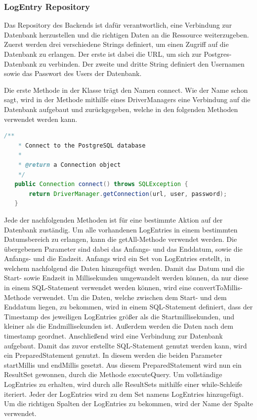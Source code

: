 \subsubsection{LogEntry Repository}
Das Repository des Backends ist dafür verantwortlich, eine Verbindung zur Datenbank herzustellen und die richtigen Daten an die Ressource weiterzugeben. Zuerst werden drei verschiedene Strings definiert, um einen Zugriff auf die Datenbank zu erlangen. Der erste ist dabei die URL, um sich zur Postgres-Datenbank zu verbinden. Der zweite und dritte String definiert den Usernamen sowie das Passwort des Users der Datenbank.
 
Die erste Methode in der Klasse trägt den Namen connect. Wie der Name schon sagt, wird in der Methode mithilfe eines DriverManagers eine Verbindung auf die Datenbank aufgebaut und zurückgegeben, welche in den folgenden Methoden verwendet werden kann.
 
\begin{lstlisting}[language=java,caption=Connect to SQL Database,label=lst:impl:connect]
    /**
    * Connect to the PostgreSQL database
    *
    * @return a Connection object
    */
   public Connection connect() throws SQLException {
       return DriverManager.getConnection(url, user, password);
   }  
\end{lstlisting}
 
Jede der nachfolgenden Methoden ist für eine bestimmte Aktion auf der Datenbank zuständig.
Um alle vorhandenen LogEntries in einem bestimmten Datumsbereich zu erlangen, kann die getAll-Methode verwendet werden. Die übergebenen Parameter sind dabei das Anfangs- und das Enddatum, sowie die Anfangs- und die Endzeit. Anfangs wird ein Set von LogEntries erstellt, in welchem nachfolgend die Daten hinzugefügt werden. Damit das Datum und die Start- sowie Endzeit in Millisekunden umgewandelt werden können, da nur diese in einem SQL-Statement verwendet werden können, wird eine convertToMillis-Methode verwendet.
Um die Daten, welche zwischen dem Start- und dem Enddatum liegen, zu bekommen, wird in einem SQL-Statement definiert, dass der Timestamp des jeweiligen LogEntries größer als die Startmillisekunden, und kleiner als die Endmillisekunden ist. Außerdem werden die Daten nach dem timestamp geordnet. Anschließend wird eine Verbindung zur Datenbank aufgebaut. Damit das zuvor erstellte SQL-Statement genutzt werden kann, wird ein PreparedStatement genutzt. In diesem werden die beiden Parameter startMillis und endMillis gesetzt. Aus diesem PreparedStatement wird nun ein ResultSet gewonnen, durch die Methode executeQuery. Um vollständige LogEntries zu erhalten, wird durch alle ResultSets mithilfe einer while-Schleife iteriert. Jeder der LogEntries wird zu dem Set namens LogEntries hinzugefügt. Um die richtigen Spalten der LogEntries zu bekommen, wird der Name der Spalte verwendet.
 
